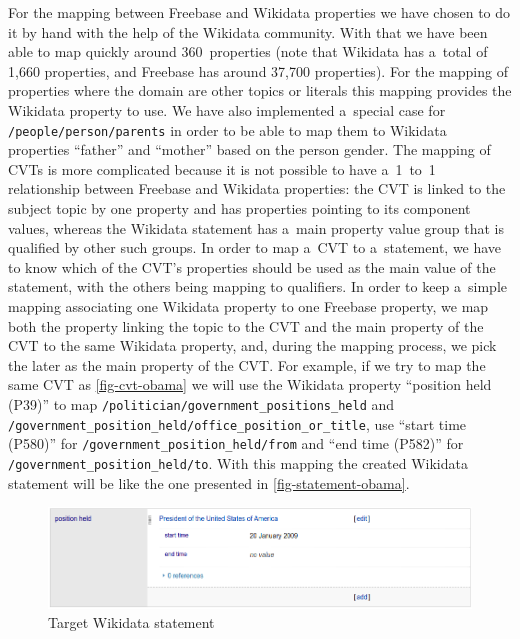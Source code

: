 \documentclass{sig-alternate}
\begin{document}
For the mapping between Freebase and Wikidata properties we have chosen to do it by hand
with the help of the Wikidata community.
With that we have been able to map quickly around 360~properties
(note that Wikidata has a~total of 1,660 properties, and Freebase has around 37,700 properties).
For the mapping of properties where the domain are other topics or literals
this mapping provides the Wikidata property to use.
We have also implemented a~special case for \texttt{/people/person/parents}
in order to be able to map them to Wikidata properties ``father'' and ``mother''
based on the person gender.
The mapping of CVTs is more complicated because it is not possible to have a~1~to~1 relationship
between Freebase and Wikidata properties: the CVT is linked to the subject topic by one property
and has properties pointing to its component values, whereas the Wikidata statement
has a~main property value group that is qualified by other such groups.
In order to map a~CVT to a~statement, we have to know which of the CVT's properties
should be used as the main value of the statement, with the others being mapping to qualifiers.
In order to keep a~simple mapping associating one Wikidata property to one Freebase property,
we map both the property linking the topic to the CVT
and the main property of the CVT to the same Wikidata property, and, during the mapping process,
we pick the later as the main property of the CVT.
For example, if we try to map the same CVT as \autoref{fig-cvt-obama}
we will use the Wikidata property ``position held (P39)'' to map
\texttt{/politician/government\_positions\_held} and
\texttt{/government\_position\_held/office\_position\_or\_title}, use ``start time (P580)''
for \texttt{/government\_position\_held/from} and ``end time (P582)'' for
\texttt{/government\_position\_held/to}.
With this mapping the created Wikidata statement will be
like the one presented in \autoref{fig-statement-obama}.

\begin{figure}
\centering
\includegraphics[width=8.45 cm]{img/wikidata-statement-obama.png}
\caption{Target Wikidata statement}
\label{fig-statement-obama}
\end{figure}
\end{document}
